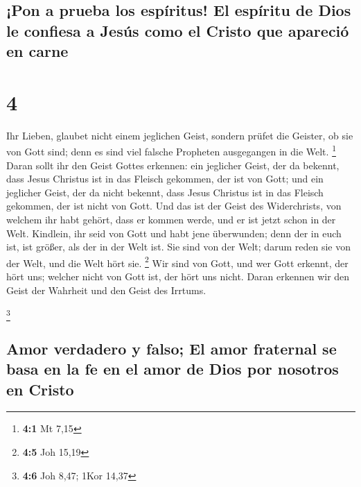 \hypertarget{pon-a-prueba-los-espuxedritus-el-espuxedritu-de-dios-le-confiesa-a-jesuxfas-como-el-cristo-que-apareciuxf3-en-carne}{%
\subsection{¡Pon a prueba los espíritus! El espíritu de Dios le confiesa
a Jesús como el Cristo que apareció en
carne}\label{pon-a-prueba-los-espuxedritus-el-espuxedritu-de-dios-le-confiesa-a-jesuxfas-como-el-cristo-que-apareciuxf3-en-carne}}

\hypertarget{section-3}{%
\section{4}\label{section-3}}

 Ihr Lieben, glaubet nicht einem jeglichen Geist, sondern
prüfet die Geister, ob sie von Gott sind; denn es sind viel falsche
Propheten ausgegangen in die Welt. \footnote{\textbf{4:1} Mt 7,15}
 Daran sollt ihr den Geist Gottes erkennen: ein jeglicher
Geist, der da bekennt, dass Jesus Christus ist in das Fleisch gekommen,
der ist von Gott;  und ein jeglicher Geist, der da nicht
bekennt, dass Jesus Christus ist in das Fleisch gekommen, der ist nicht
von Gott. Und das ist der Geist des Widerchrists, von welchem ihr habt
gehört, dass er kommen werde, und er ist jetzt schon in der Welt.
 Kindlein, ihr seid von Gott und habt jene überwunden;
denn der in euch ist, ist größer, als der in der Welt ist.
 Sie sind von der Welt; darum reden sie von der Welt, und
die Welt hört sie. \footnote{\textbf{4:5} Joh 15,19}  Wir
sind von Gott, und wer Gott erkennt, der hört uns; welcher nicht von
Gott ist, der hört uns nicht. Daran erkennen wir den Geist der Wahrheit
und den Geist des Irrtums.

\footnote{\textbf{4:6} Joh 8,47; 1Kor 14,37}

\hypertarget{amor-verdadero-y-falso-el-amor-fraternal-se-basa-en-la-fe-en-el-amor-de-dios-por-nosotros-en-cristo}{%
\subsection{Amor verdadero y falso; El amor fraternal se basa en la fe
en el amor de Dios por nosotros en
Cristo}\label{amor-verdadero-y-falso-el-amor-fraternal-se-basa-en-la-fe-en-el-amor-de-dios-por-nosotros-en-cristo}}

